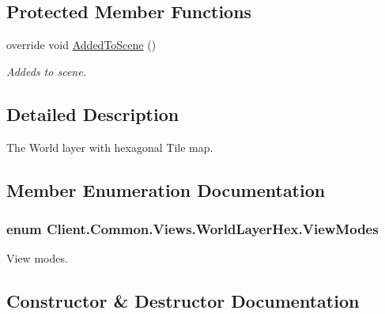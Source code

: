 \subsection*{Protected Member Functions}
\begin{DoxyCompactItemize}
\item 
override void \hyperlink{classClient_1_1Common_1_1Views_1_1WorldLayerHex_aa0459e7aeab58ee69da5f5b50cdf2d79}{Added\+To\+Scene} ()
\begin{DoxyCompactList}\small\item\em Addeds to scene. \end{DoxyCompactList}\end{DoxyCompactItemize}


\subsection{Detailed Description}
The World layer with hexagonal Tile map. 



\subsection{Member Enumeration Documentation}
\hypertarget{classClient_1_1Common_1_1Views_1_1WorldLayerHex_a40891eae0c33b440c8038472a5f64eb8}{}
\subsubsection[{View\+Modes}]{\setlength{\rightskip}{0pt plus 5cm}enum {\bf Client.\+Common.\+Views.\+World\+Layer\+Hex.\+View\+Modes}\hspace{0.3cm}{\ttfamily [strong]}}\label{classClient_1_1Common_1_1Views_1_1WorldLayerHex_a40891eae0c33b440c8038472a5f64eb8}


View modes. 



\subsection{Constructor \& Destructor Documentation}
\hypertarget{classClient_1_1Common_1_1Views_1_1WorldLayerHex_a748a6034c04a2dcb352f0ee616d68daf}{}
